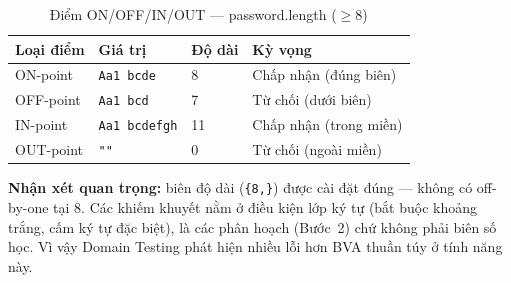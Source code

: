 \documentclass[12pt, a4paper]{report}
\begin{document}
\begin{table}[H]
    \centering
    \caption{Điểm ON/OFF/IN/OUT — password.length ($\ge 8$)}
    \begin{tabularx}{\linewidth}{L{2.4cm} L{3.2cm} C{2cm} X}
        \toprule
        \textbf{Loại điểm} & \textbf{Giá trị} & \textbf{Độ dài} & \textbf{Kỳ vọng} \\
        \midrule
        ON-point  & \texttt{Aa1 bcde}     & 8  & Chấp nhận (đúng biên) \\
        OFF-point & \texttt{Aa1 bcd}      & 7  & Từ chối (dưới biên) \\
        IN-point  & \texttt{Aa1 bcdefgh}  & 11 & Chấp nhận (trong miền) \\
        OUT-point & \verb|""|             & 0  & Từ chối (ngoài miền) \\
        \bottomrule
    \end{tabularx}
\end{table}

\noindent\textbf{Nhận xét quan trọng:} biên độ dài (\texttt{\{8,\}}) được cài đặt đúng
— không có off-by-one tại 8. Các khiếm khuyết nằm ở điều kiện lớp ký tự (bắt buộc
khoảng trắng, cấm ký tự đặc biệt), là các phân hoạch (Bước~2) chứ không phải biên số
học. Vì vậy Domain Testing phát hiện nhiều lỗi hơn BVA thuần túy ở tính năng này.
\end{document}
